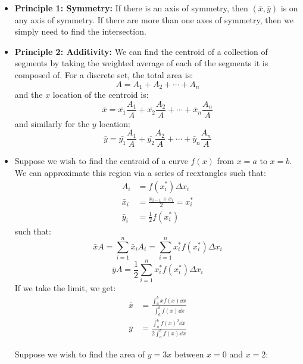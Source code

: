 \begin{itemize}
    \item \textbf{Principle 1: Symmetry:} If there is an axis of symmetry, then $(\bar{x},\bar{y})$ is on any axis of symmetry. If there are more than one axes of symmetry, then we simply need to find the intersection.
    \item \textbf{Principle 2: Additivity:} We can find the centroid of a collection of segments by taking the weighted average of each of the segments it is composed of. For a discrete set, the total area is:
    \begin{equation}
        A = A_1 + A_2 + \cdots + A_n
    \end{equation}
    and the $x$ location of the centroid is:
    \begin{equation}
        \bar{x} = \bar{x_1} \frac{A_1}{A} + \bar{x_2}\frac{A_2}{A} + \cdots + \bar{x}_n \frac{A_n}{A}
    \end{equation}
    and similarly for the $y$ location:
    \begin{equation}
        \bar{y} = \bar{y_1} \frac{A_1}{A} + \bar{y_2}\frac{A_2}{A} + \cdots + \bar{y}_n \frac{A_n}{A}
    \end{equation}
    \item Suppose we wish to find the centroid of a curve $f(x)$ from $x=a$ to $x=b$. We can approximate this region via a series of recxtangles such that:
    \begin{align}
        A_i &= f(x_i^*)\Delta x_i \\ 
        \bar{x}_i &= \frac{x_{i-1}+x_i}{2} = x_i^* \\ 
        \bar{y}_i &= \frac{1}{2}f(x_i^*)
    \end{align}
    such that:
    \begin{equation}
        \bar{x}A = \sum_{i=1}^n \bar{x}_i A_i = \sum_{i=1}^n x_i^* f(x_i^*)\Delta x_i
    \end{equation}
    \begin{equation}
        \bar{y}A = \frac{1}{2}\sum_{i=1}^n x_i^* f(x_i^*)\Delta x_i
    \end{equation}
    If we take the limit, we get:
    \begin{align}
        \bar{x} &= \frac{\int_a^b xf(x) \dd{x}}{\int_a^b f(x) \dd{x}} \\ 
        \bar{y} &= \frac{\int_a^b f(x)^2 \dd{x}}{2\int_a^b f(x) \dd{x}}
    \end{align}
    \begin{example}
        Suppose we wish to find the area of $y=3x$ between $x=0$ and $x=2$:
        \begin{center}

\end{center}
\end{example}
\end{itemize}
